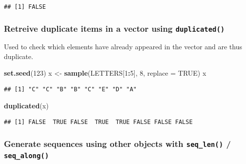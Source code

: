 \documentclass[
]{book}
\newenvironment{Shaded}{\begin{snugshade}}{\end{snugshade}}
\newcommand{\AttributeTok}[1]{\textcolor[rgb]{0.13,0.29,0.53}{#1}}
\newcommand{\ConstantTok}[1]{\textcolor[rgb]{0.56,0.35,0.01}{#1}}
\newcommand{\DecValTok}[1]{\textcolor[rgb]{0.00,0.00,0.81}{#1}}
\newcommand{\FunctionTok}[1]{\textcolor[rgb]{0.13,0.29,0.53}{\textbf{#1}}}
\newcommand{\NormalTok}[1]{#1}
\newcommand{\OtherTok}[1]{\textcolor[rgb]{0.56,0.35,0.01}{#1}}
\newcommand{\SpecialCharTok}[1]{\textcolor[rgb]{0.81,0.36,0.00}{\textbf{#1}}}
\begin{document}
\begin{verbatim}
## [1] FALSE
\end{verbatim}

\hypertarget{retreive-duplicate-items-in-a-vector-using-duplicated}{%
\subsubsection*{\texorpdfstring{Retreive duplicate items in a vector using \texttt{duplicated()}}{Retreive duplicate items in a vector using duplicated()}}\label{retreive-duplicate-items-in-a-vector-using-duplicated}}

Used to check which elements have already appeared in the vector and are thus duplicate.

\begin{Shaded}
\begin{Highlighting}[]
\FunctionTok{set.seed}\NormalTok{(}\DecValTok{123}\NormalTok{)}
\NormalTok{x }\OtherTok{\textless{}{-}} \FunctionTok{sample}\NormalTok{(LETTERS[}\DecValTok{1}\SpecialCharTok{:}\DecValTok{5}\NormalTok{], }\DecValTok{8}\NormalTok{, }\AttributeTok{replace =} \ConstantTok{TRUE}\NormalTok{)}
\NormalTok{x}
\end{Highlighting}
\end{Shaded}

\begin{verbatim}
## [1] "C" "C" "B" "B" "C" "E" "D" "A"
\end{verbatim}

\begin{Shaded}
\begin{Highlighting}[]
\FunctionTok{duplicated}\NormalTok{(x)}
\end{Highlighting}
\end{Shaded}

\begin{verbatim}
## [1] FALSE  TRUE FALSE  TRUE  TRUE FALSE FALSE FALSE
\end{verbatim}

\hypertarget{generate-sequences-using-other-objects-with-seq_len-seq_along}{%
\subsubsection*{\texorpdfstring{Generate sequences using other objects with \texttt{seq\_len()} / \texttt{seq\_along()}}{Generate sequences using other objects with seq\_len() / seq\_along()}}\label{generate-sequences-using-other-objects-with-seq_len-seq_along}}
\end{document}

